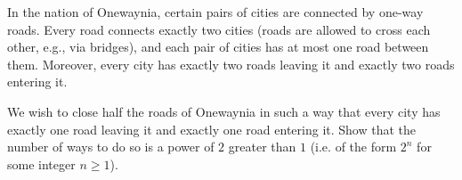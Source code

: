 In the nation of Onewaynia, certain pairs of cities are connected by one-way roads. Every road connects exactly two cities (roads are allowed to cross each other, e.g., via bridges), and each pair of cities has at most one road between them. Moreover, every city has exactly two roads leaving it and exactly two roads entering it.

We wish to close half the roads of Onewaynia in such a way that every city has exactly one road leaving it and exactly one road entering it. Show that the number of ways to do so is a power of $2$ greater than $1$ (i.e. of the form $2^n$ for some integer $n\geq1$).